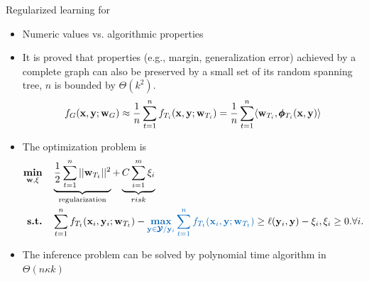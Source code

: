 \documentclass[first=dgreen,second=purple,logo=yellowexc]{aaltoslides}
\begin{document}
{\begin{frame}{Regularized learning for \rta}
	\begin{itemize}
		\item Numeric values vs. algorithmic properties 
		\item It is proved that properties (e.g., margin, generalization error) achieved by a complete graph can also be preserved by a small set of its random spanning tree, $n$ is bounded by $\Theta(k^2)$.
		\begin{align*}
			f_G(\mathbf {x},\mathbf {y};\mathbf {w}_G) \approx \frac{1}{n}\sum_{t=1}^nf_{T_i}(\mathbf {x},\mathbf {y};\mathbf {w}_{T_i}) = \frac{1}{n}\sum_{t=1}^n\langle \mathbf {w}_{T_i}, \pmb \phi_{T_i}(\mathbf {x},\mathbf {y}) \rangle
		\end{align*}
		\item The optimization problem is 
		\begin{align*}
			\underset{\vw,\vxi}{\minimize} &\quad \underbrace{\frac{1}{2}\sum_{t=1}^{n}||\vw_{T_t}||^2}_{\text{regularization}} + \underbrace{C\sum_{i=1}^m\xi_i}_{risk}\\
			\st &\quad \sum_{t=1}^{n}f_{T_t}(\vx_i,\vy_i;\vw_{T_t}) - {\color{aaltoblue}\underset{\vy\in\vYcal/\vy_i}{\maximize}\sum_{t=1}^{n}f_{T_t}(\vx_i,\vy;\vw_{T_t})} \ge \ell(\vy_i,\vy) - \xi_i,\xi_i\ge0.\forall i.
		\end{align*}
		\item The inference problem can be solved by polynomial time algorithm in $\Theta(n\kappa k)$
	\end{itemize}
\end{frame}

}
\end{document}

